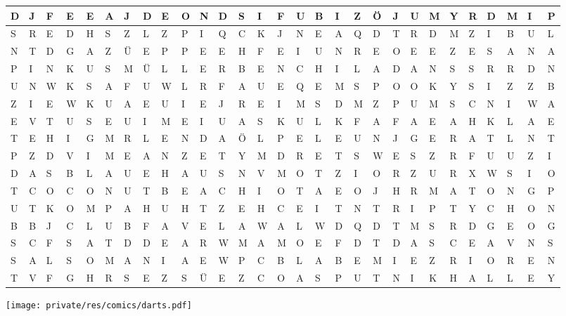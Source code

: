 \begin{center}
\begin{tabular}{| *{29}{>{\centering\arraybackslash}m{1.1em} |}}
		\\ \hline
		D & J & F & E & E & A & J & D & E & O & N & D & S & I & F & U & B & I
			& Z & Ö & J & U & M & Y & R & D & M & I & P
		\\ \hline
		S & R & E & D & H & S & Z & L & Z & P & I & Q & C & K & J & N & E & A
			& Q & D & T & R & D & M & Z & I & B & U & L
		\\ \hline
		N & T & D & G & A & Z & Ü & E & P & P & E & E & H & F & E & I & U & N
			& R & E & O & E & E & Z & E & S & A & N & A
		\\ \hline
		P & I & N & K & U & S & M & Ü & L & L & E & R & B & E & N & C & H & I
			& L & A & D & A & N & S & S & R & R & D & N
		\\ \hline
		U & N & W & K & S & A & F & U & W & L & R & F & A & U & E & Q & E & M
			& S & P & O & O & K & Y & S & I & Z & Z & B
		\\ \hline
		Z & I & E & W & K & U & A & E & U & I & E & J & R & E & I & M & S & D
			& M & Z & P & U & M & S & C & N & I & W & A
		\\ \hline
		E & V & T & U & S & E & U & I & M & E & I & U & A & S & K & U & L & K
			& F & A & F & A & E & A & H & K & L & A & E
		\\ \hline
		T & E & H & I & G & M & R & L & E & N & D & A & Ö & L & P & E & L & E
			& U & N & J & G & E & R & A & T & L & N & T
		\\ \hline
		P & Z & D & V & I & M & E & A & N & Z & E & T & Y & M & D & R & E & T
			& S & W & E & S & Z & R & F & U & U & Z & I
		\\ \hline
		D & A & S & B & L & A & U & E & H & A & U & S & N & V & M & O & T & Z
			& I & O & R & Z & U & R & X & W & S & I & O
		\\ \hline
		T & C & O & C & O & N & U & T & B & E & A & C & H & I & O & T & A & E
			& O & J & H & R & M & A & T & O & N & G & P
		\\ \hline
		U & T & K & O & M & P & A & H & U & H & T & Z & E & H & C & E & I & T
			& N & T & R & I & P & T & Y & C & H & O & N
		\\ \hline
		B & B & J & C & L & U & B & F & A & V & E & L & A & W & A & L & W & D
			& Q & D & T & M & S & R & D & G & E & O & G
		\\ \hline
		S & C & F & S & A & T & D & D & E & A & R & W & M & A & M & O & E & F
			& D & T & D & A & S & C & E & A & V & N & S
		\\ \hline
		S & A & L & S & O & M & A & N & I & A & E & W & P & C & B & L & A & B
			& E & M & I & E & Z & R & I & O & R & E & N
		\\ \hline
		T & V & F & G & H & R & S & E & Z & S & Ü & E & Z & C & O & A & S & P
			& U & T & N & I & K & H & A & L & L & E & Y
		\\ \hline
	\end{tabular}
	
	\texttt{[image: private/res/comics/darts.pdf]}
\end{center}

